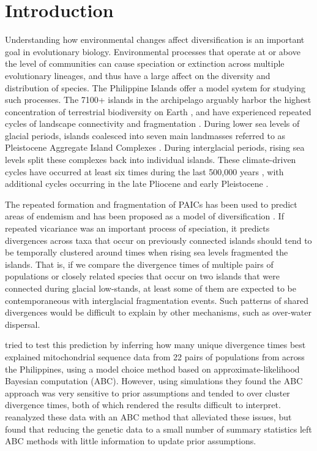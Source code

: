 \section{Introduction}

Understanding how environmental changes affect diversification is an important
goal in evolutionary biology.
Environmental processes that operate at or above the level of communities can
cause speciation or extinction across multiple evolutionary lineages, and thus
have a large affect on the diversity and distribution of species.
The Philippine Islands offer a model system for studying such processes.
The 7100+ islands in the archipelago arguably harbor the highest concentration
of terrestrial biodiversity on Earth \citep{RafeDiesmos2009, Heaney1998}, and
have experienced repeated cycles of landscape connectivity and fragmentation
\citep{Voris2000}.
During lower sea levels of glacial periods, islands coalesced into seven main
landmasses referred to as Pleistocene Aggregate Island Complexes
\citep[PAICs;][]{RafeDiesmos2001}.
During interglacial periods, rising sea levels split these complexes back into
individual islands.
These climate-driven cycles have occurred at least six times during the last
500,000 years \citep{Rohling1998, Siddall2003}, with additional cycles
occurring in the late Pliocene and early Pleistocene
\citep{Haq1987, Miller2005}.

The repeated formation and fragmentation of PAICs has been used to predict
areas of endemism
and has been proposed as a model of diversification
\citep{Rafe2013AREES,RafeDiesmos2009, Heaney1986, Esselstyn2009MPE, Linkem2010,
    Siler2010, Siler2012, Roberts2006, Roberts2006MolEcol,Heaney1986,
    RafeDiesmos2001, RafeDiesmos2009}.
If repeated vicariance was an important process of speciation,
it predicts divergences across taxa that occur on previously connected islands
should tend to be temporally clustered around times when rising sea levels
fragmented the islands.
That is, if we compare the divergence times of multiple pairs of populations or
closely related species that occur on two islands that were connected during
glacial low-stands, at least some of them are expected to be contemporaneous
with interglacial fragmentation events.
Such patterns of shared divergences would be difficult to explain by other
mechanisms, such as over-water dispersal.

\citet{Oaks2012} tried to test this prediction by inferring how many unique
divergence times best explained mitochondrial sequence data from 22 pairs of
populations from across the Philippines, using a model choice method based on
approximate-likelihood Bayesian computation (ABC).
However, using simulations they found the ABC approach was very sensitive to
prior assumptions and tended to over cluster divergence times, both of which
rendered the results difficult to interpret.
\citet{Oaks2014dpp} reanalyzed these data with an ABC method that alleviated
these issues, but found that reducing the genetic data to a small number of
summary statistics left ABC methods with little information to update prior
assumptions.

